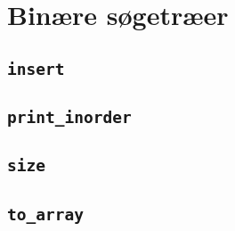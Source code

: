 \section{Binære søgetræer}
\subsection{\tt insert}
\subsection{\tt print\_inorder}
\subsection{\tt size}
\subsection{\tt to\_array}
